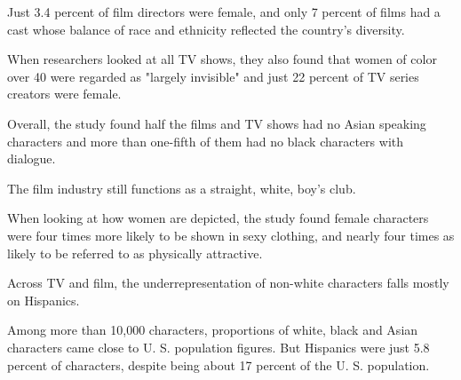 Just 3.4 percent of film directors were female, and only 7 percent of films had a cast whose balance of race and ethnicity reflected the country's diversity.

When researchers looked at all TV shows, they also found that women of color over 40 were regarded as "largely invisible" and just 22 percent of TV series creators were female.

Overall, the study found half the films and TV shows had no Asian speaking characters and more than one-fifth of them had no black characters with dialogue.

The film industry still functions as a straight, white, boy's club.

When looking at how women are depicted, the study found female characters were four times more likely to be shown in sexy clothing, and nearly four times as likely to be referred to as physically attractive.

Across TV and film, the underrepresentation of non-white characters falls mostly on Hispanics.

Among more than 10,000 characters, proportions of white, black and Asian characters came close to U. S. population figures. But Hispanics were just 5.8 percent of characters, despite being about 17 percent of the U. S. population.